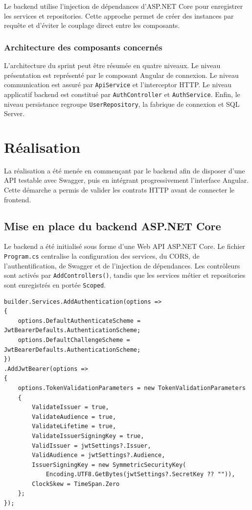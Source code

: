 \documentclass[12pt,a4paper]{report}
\begin{document}
Le backend utilise l'injection de dépendances d'ASP.NET Core pour enregistrer les services et repositories. Cette approche permet de créer des instances par requête et d'éviter le couplage direct entre les composants.

\subsubsection*{Architecture des composants concernés}

L'architecture du sprint peut être résumée en quatre niveaux. Le niveau présentation est représenté par le composant Angular de connexion. Le niveau communication est assuré par \texttt{ApiService} et l'interceptor HTTP. Le niveau applicatif backend est constitué par \texttt{AuthController} et \texttt{AuthService}. Enfin, le niveau persistance regroupe \texttt{UserRepository}, la fabrique de connexion et SQL Server.

\section{Réalisation}

La réalisation a été menée en commençant par le backend afin de disposer d'une API testable avec Swagger, puis en intégrant progressivement l'interface Angular. Cette démarche a permis de valider les contrats HTTP avant de connecter le frontend.

\subsection{Mise en place du backend ASP.NET Core}

Le backend a été initialisé sous forme d'une Web API ASP.NET Core. Le fichier \texttt{Program.cs} centralise la configuration des services, du CORS, de l'authentification, de Swagger et de l'injection de dépendances. Les contrôleurs sont activés par \texttt{AddControllers()}, tandis que les services métier et repositories sont enregistrés en portée \texttt{Scoped}.

\begin{lstlisting}[caption={Configuration JWT et injection des services dans ASP.NET Core}]
builder.Services.AddAuthentication(options =>
{
    options.DefaultAuthenticateScheme = JwtBearerDefaults.AuthenticationScheme;
    options.DefaultChallengeScheme = JwtBearerDefaults.AuthenticationScheme;
})
.AddJwtBearer(options =>
{
    options.TokenValidationParameters = new TokenValidationParameters
    {
        ValidateIssuer = true,
        ValidateAudience = true,
        ValidateLifetime = true,
        ValidateIssuerSigningKey = true,
        ValidIssuer = jwtSettings?.Issuer,
        ValidAudience = jwtSettings?.Audience,
        IssuerSigningKey = new SymmetricSecurityKey(
            Encoding.UTF8.GetBytes(jwtSettings?.SecretKey ?? "")),
        ClockSkew = TimeSpan.Zero
    };
});
\end{lstlisting}
\end{document}
